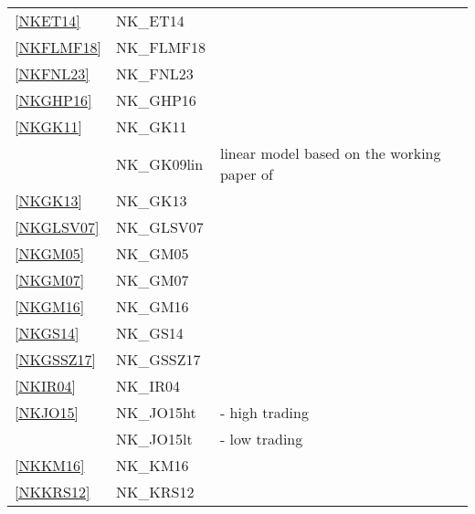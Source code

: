 \documentclass[11pt,a4paper]{article}
\begin{document}
\begin{table}[H]
\begin{tabularx}{\textwidth}{lll}
			\ref{NKET14} & NK\_ET14 & \cite{EllisonTischbirek2014} \\
			\ref{NKFLMF18} & NK\_FLMF18 & \cite{filardo2018monetary} \\
			\ref{NKFNL23} & NK\_FNL23 & \cite{ferraria2023toward} \\
			\ref{NKGHP16} & NK\_GHP16 & \cite{gnocci2016housework} \\
			\ref{NKGK11} & NK\_GK11 & \cite{GertlerKaradi2011} \\
			& NK\_GK09lin & linear model based on the working paper of \cite{GertlerKaradi2011} \\
			\ref{NKGK13} & NK\_GK13 & \cite{GertlerKaradi2013} \\
			\ref{NKGLSV07} & NK\_GLSV07 & \cite{gali2007understanding} \\
			\ref{NKGM05} & NK\_GM05 & \cite{GaliMonacelli2005} \\
			\ref{NKGM07} & NK\_GM07 & \cite{goodfriend2007banking} \\
			\ref{NKGM16} & NK\_GM16 & \cite{gali2016understanding} \\
			\ref{NKGS14} & NK\_GS14 & \cite{gambacorta2014should} \\
			\ref{NKGSSZ17} & NK\_GSSZ17 & \cite{gilchrist2017inflation} \\
			\ref{NKIR04} & NK\_IR04 & \cite{Ireland2004} \\
			\ref{NKJO15} & NK\_JO15ht & \cite{jang2015okano} - high trading\\
			&  NK\_JO15lt & \cite{jang2015okano} - low trading \\
			\ref{NKKM16} & NK\_KM16 & \cite{krause2016public} \\
			\ref{NKKRS12} & NK\_KRS12 & \cite{KannanRabanalScott2012} \\

\end{tabularx}
\end{table}
\end{document}
